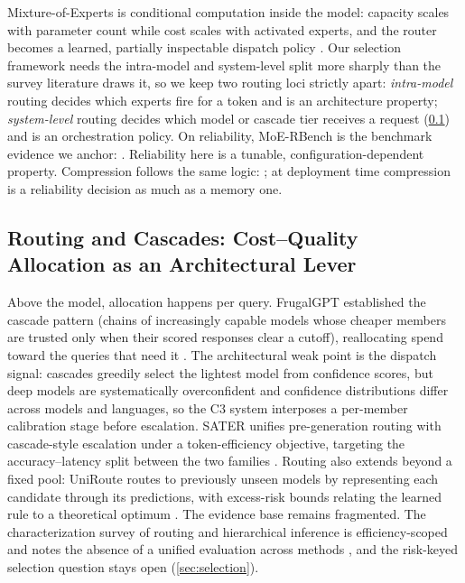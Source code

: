 Mixture-of-Experts is conditional computation inside the model: capacity scales with parameter count while cost scales with activated experts, and the router becomes a learned, partially inspectable dispatch policy \cite{id240706204}. Our selection framework needs the intra-model and system-level split more sharply than the survey literature draws it, so we keep two routing loci strictly apart: \emph{intra-model} routing decides which experts fire for a token and is an architecture property; \emph{system-level} routing decides which model or cascade tier receives a request (\cref{sec:l3-routing}) and is an orchestration policy. On reliability, MoE-RBench is the benchmark evidence we anchor: . Reliability here is a tunable, configuration-dependent property. Compression follows the same logic: ; at deployment time compression is a reliability decision as much as a memory one.

\subsection{Routing and Cascades: Cost--Quality Allocation as an Architectural Lever}
\label{sec:l3-routing}

Above the model, allocation happens per query. FrugalGPT established the cascade pattern (chains of increasingly capable models whose cheaper members are trusted only when their scored responses clear a cutoff), reallocating spend toward the queries that need it \cite{frugalgpt2023}. The architectural weak point is the dispatch signal: cascades greedily select the lightest model from confidence scores, but deep models are systematically overconfident and confidence distributions differ across models and languages, so the C3 system \cite{id240215991} interposes a per-member calibration stage before escalation. SATER unifies pre-generation routing with cascade-style escalation under a token-efficiency objective, targeting the accuracy--latency split between the two families \cite{id251005164}. Routing also extends beyond a fixed pool: UniRoute routes to previously unseen models by representing each candidate through its predictions, with excess-risk bounds relating the learned rule to a theoretical optimum \cite{id250208773}. The evidence base remains fragmented. The characterization survey of routing and hierarchical inference is efficiency-scoped and notes the absence of a unified evaluation across methods \cite{id250606579}, and the risk-keyed selection question stays open (\cref{sec:selection}).

